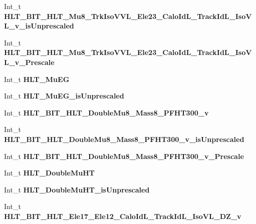 \begin{DoxyCompactItemize}
Int\+\_\+t {\bfseries H\+L\+T\+\_\+\+B\+I\+T\+\_\+\+H\+L\+T\+\_\+\+Mu8\+\_\+\+Trk\+Iso\+V\+V\+L\+\_\+\+Ele23\+\_\+\+Calo\+Id\+L\+\_\+\+Track\+Id\+L\+\_\+\+Iso\+V\+L\+\_\+v\+\_\+is\+Unprescaled}
\item 
\hypertarget{classMiniTree_a8a39f045209f7c752bb37510e55345a2}{}\label{classMiniTree_a8a39f045209f7c752bb37510e55345a2} 
Int\+\_\+t {\bfseries H\+L\+T\+\_\+\+B\+I\+T\+\_\+\+H\+L\+T\+\_\+\+Mu8\+\_\+\+Trk\+Iso\+V\+V\+L\+\_\+\+Ele23\+\_\+\+Calo\+Id\+L\+\_\+\+Track\+Id\+L\+\_\+\+Iso\+V\+L\+\_\+v\+\_\+\+Prescale}
\item 
\hypertarget{classMiniTree_a8e3f9003565819fec794cfd20b9fdd3d}{}\label{classMiniTree_a8e3f9003565819fec794cfd20b9fdd3d} 
Int\+\_\+t {\bfseries H\+L\+T\+\_\+\+Mu\+EG}
\item 
\hypertarget{classMiniTree_a98323efc2b046b7dc0647eac383a430b}{}\label{classMiniTree_a98323efc2b046b7dc0647eac383a430b} 
Int\+\_\+t {\bfseries H\+L\+T\+\_\+\+Mu\+E\+G\+\_\+is\+Unprescaled}
\item 
\hypertarget{classMiniTree_a579fadc920d5dfd7aafe50aff24ac6cb}{}\label{classMiniTree_a579fadc920d5dfd7aafe50aff24ac6cb} 
Int\+\_\+t {\bfseries H\+L\+T\+\_\+\+B\+I\+T\+\_\+\+H\+L\+T\+\_\+\+Double\+Mu8\+\_\+\+Mass8\+\_\+\+P\+F\+H\+T300\+\_\+v}
\item 
\hypertarget{classMiniTree_a53f39f8b83287c4b6b2da2ff1191fd17}{}\label{classMiniTree_a53f39f8b83287c4b6b2da2ff1191fd17} 
Int\+\_\+t {\bfseries H\+L\+T\+\_\+\+B\+I\+T\+\_\+\+H\+L\+T\+\_\+\+Double\+Mu8\+\_\+\+Mass8\+\_\+\+P\+F\+H\+T300\+\_\+v\+\_\+is\+Unprescaled}
\item 
\hypertarget{classMiniTree_a92037bb803b97eb563abea46d78c67be}{}\label{classMiniTree_a92037bb803b97eb563abea46d78c67be} 
Int\+\_\+t {\bfseries H\+L\+T\+\_\+\+B\+I\+T\+\_\+\+H\+L\+T\+\_\+\+Double\+Mu8\+\_\+\+Mass8\+\_\+\+P\+F\+H\+T300\+\_\+v\+\_\+\+Prescale}
\item 
\hypertarget{classMiniTree_a06d53577cefc729a1fabd70705cfef3e}{}\label{classMiniTree_a06d53577cefc729a1fabd70705cfef3e} 
Int\+\_\+t {\bfseries H\+L\+T\+\_\+\+Double\+Mu\+HT}
\item 
\hypertarget{classMiniTree_a5d16638329b680de2f3dea36dc6cdabf}{}\label{classMiniTree_a5d16638329b680de2f3dea36dc6cdabf} 
Int\+\_\+t {\bfseries H\+L\+T\+\_\+\+Double\+Mu\+H\+T\+\_\+is\+Unprescaled}
\item 
\hypertarget{classMiniTree_a524c275189ce2fd33956b842457d7947}{}\label{classMiniTree_a524c275189ce2fd33956b842457d7947} 
Int\+\_\+t {\bfseries H\+L\+T\+\_\+\+B\+I\+T\+\_\+\+H\+L\+T\+\_\+\+Ele17\+\_\+\+Ele12\+\_\+\+Calo\+Id\+L\+\_\+\+Track\+Id\+L\+\_\+\+Iso\+V\+L\+\_\+\+D\+Z\+\_\+v}

\end{DoxyCompactItemize}
